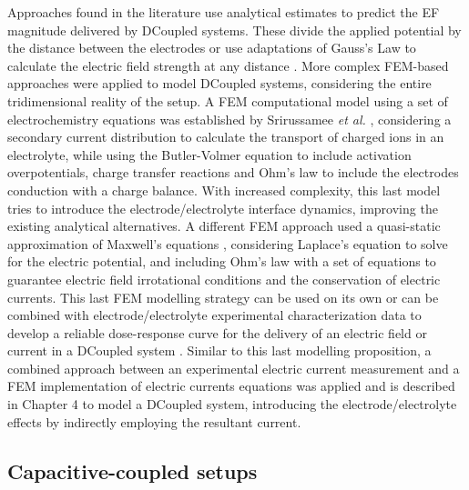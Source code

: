 Approaches found in the literature use analytical estimates to predict the \ac{EF} magnitude delivered by DCoupled systems. These divide the applied potential by the distance between the electrodes \cite{Mobini2016-jh} or use adaptations of Gauss’s Law to calculate the electric field strength at any distance \cite{Hronik-Tupaj2011-cx}. More complex \ac{FEM}-based approaches were applied to model \ac{DCoupled} systems, considering the entire tridimensional reality of the setup. A \ac{FEM} computational model using a set of electrochemistry equations was established by Srirussamee \textit{et al.} \cite{Srirussamee2021-cj}, considering a secondary current distribution to calculate the transport of charged ions in an electrolyte, while using the Butler-Volmer equation to include activation overpotentials, charge transfer reactions and Ohm's law to include the electrodes conduction with a charge balance. With increased complexity, this last model tries to introduce the electrode/electrolyte interface dynamics, improving the existing analytical alternatives. A different \ac{FEM} approach used a quasi-static approximation of Maxwell’s equations \cite{Stephan2020-qh, Shaner2023-on, Zimmermann2021-fx}, considering Laplace’s equation to solve for the electric potential, and including Ohm's law with a set of equations to guarantee electric field irrotational conditions and the conservation of electric currents. This last \ac{FEM} modelling strategy can be used on its own or can be combined with electrode/electrolyte experimental characterization data to develop a reliable dose-response curve for the delivery of an electric field or current in a \ac{DCoupled} system \cite{Zimmermann2023-gm}. Similar to this last modelling proposition, a combined approach between an experimental electric current measurement and a \ac{FEM} implementation of electric currents equations was applied and is described in Chapter 4 to model a \ac{DCoupled} system, introducing the electrode/electrolyte effects by indirectly employing the resultant current.  


\subsection{Capacitive-coupled setups}



